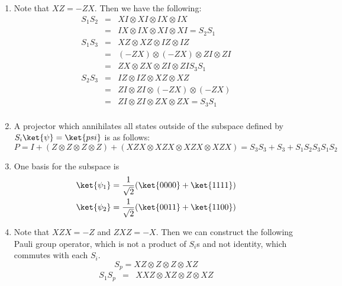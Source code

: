 \documentclass[12pt]{article}
\begin{document}
\begin{enumerate}

\item %
Note that $XZ= - ZX$. Then we have the following:
%
\begin{eqnarray*}
S_1S_2 & = & XI \otimes XI \otimes IX \otimes IX\\
       & = & IX \otimes IX \otimes XI \otimes XI = S_2S_1 \\
S_1S_3 & = & XZ \otimes XZ \otimes IZ \otimes IZ\\
       & = & (-ZX) \otimes (-ZX) \otimes ZI \otimes ZI\\
       & = & ZX \otimes ZX \otimes ZI \otimes ZI S_3S_1\\
S_2S_3 & = & IZ \otimes IZ \otimes XZ \otimes XZ\\
       & = & ZI \otimes ZI \otimes (-ZX) \otimes (-ZX)\\
       & = & ZI \otimes ZI \otimes ZX \otimes ZX = S_3S_1\\
\end{eqnarray*}
\item %
A projector which annihilates all states outside of the subspace defined by
$S_i\ket{\psi} = \ket{psi}$ is as follows:
%
\begin{displaymath}
P = I + (Z \otimes Z \otimes Z \otimes Z) + (XZX\otimes XZX \otimes XZX \otimes XZX) = S_3S_3 + S_3 + S_1S_2S_3S_1S_2
\end{displaymath}
%
\item %
One basis for the subspace is
%
\begin{eqnarray*}
\ket{\psi_1} & = \normtwo(\ket{0000}+\ket{1111})\\
\ket{\psi_2} & = \normtwo(\ket{0011}+\ket{1100})
\end{eqnarray*}
%
\item %
Note that $XZX= -Z$ and $ZXZ = -X$. Then we can construct the following
Pauli group operator, which is not a product of $S_i$s and not identity,
which commutes with each $S_i$.
%
\begin{displaymath}
S_p = XZ \otimes Z \otimes Z \otimes XZ
\end{displaymath}
%
\begin{eqnarray*}
S_1S_p & = & XXZ \otimes XZ \otimes Z \otimes XZ\\

\end{eqnarray*}
\end{enumerate}
\end{document}
